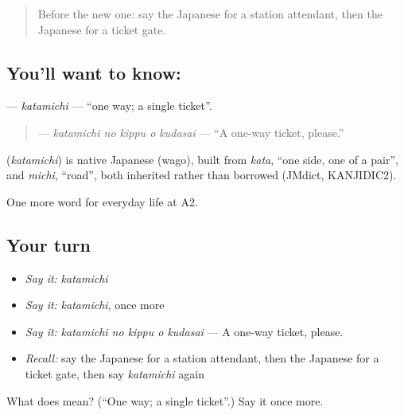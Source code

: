\label{lesson:JA-C205-katamichi}



\begin{quote}
Before the new one: say the Japanese for a station attendant, then the Japanese for a ticket gate.
\end{quote}

\subsection*{You'll want to know: }
\textbf{} — \emph{katamichi} — \textquotedblleft{}one way; a single ticket\textquotedblright{}.

\begin{quote}
\textbf{  } — \emph{katamichi no kippu o kudasai} — \textquotedblleft{}A one-way ticket, please.\textquotedblright{}
\end{quote}

\begin{cousinweb}
\textbf{} (\emph{katamichi}) is native Japanese (wago), built from \emph{kata}, \textquotedblleft{}one side, one of a pair\textquotedblright{}, and \emph{michi}, \textquotedblleft{}road\textquotedblright{}, both inherited rather than borrowed (JMdict, KANJIDIC2).
\end{cousinweb}

\begin{grammarlens}[title={What you've built}]
One more word for everyday life at A2.
\end{grammarlens}

\subsection*{Your turn}
\begin{itemize}
\raggedright
  \item \emph{Say it:} \emph{katamichi}
  \item \emph{Say it:} \emph{katamichi}, once more
  \item \emph{Say it:} \emph{katamichi no kippu o kudasai} — A one-way ticket, please.
  \item \emph{Recall:} say the Japanese for a station attendant, then the Japanese for a ticket gate, then say \emph{katamichi} again
\end{itemize}

\begin{tcolorbox}[breakable,colback=teal!4,colframe=teal!35!black,title={Before you move on}]
What does  mean? (\textquotedblleft{}One way; a single ticket\textquotedblright{}.) Say it once more.
\end{tcolorbox}
